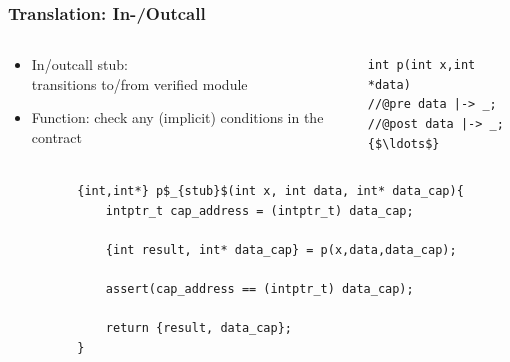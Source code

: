\documentclass{beamer}
\begin{document}
\begin{frame}[fragile]
\frametitle{Translation: In-/Outcall}

\begin{columns}
\begin{column}{0.55\textwidth}
\begin{itemize}
\item In/outcall stub:\\transitions to/from verified module
\item Function: check any (implicit) conditions in the contract
\end{itemize}
\end{column}
\begin{column}{0.42\textwidth}
\begin{lstlisting}[style=CStyle, captionpos = t]
int p(int x,int *data)
//@pre data |-> _; 
//@post data |-> _;
{$\ldots$}
\end{lstlisting}
\end{column}
\end{columns}
\vspace{-1em}

\begin{columns}
\begin{column}{0.15\textwidth}
\end{column}
\begin{column}{0.90\textwidth}
\begin{figure}[h]
  \centering
\begin{lstlisting}[style=CStyleNoNum, captionpos = t]
{int,int*} p$_{stub}$(int x, int data, int* data_cap){
	intptr_t cap_address = (intptr_t) data_cap;
	
	{int result, int* data_cap} = p(x,data,data_cap);
	
	assert(cap_address == (intptr_t) data_cap);
	
	return {result, data_cap};
}
\end{lstlisting}
\end{figure}
\end{column}
\end{columns}
\end{frame}
\end{document}
